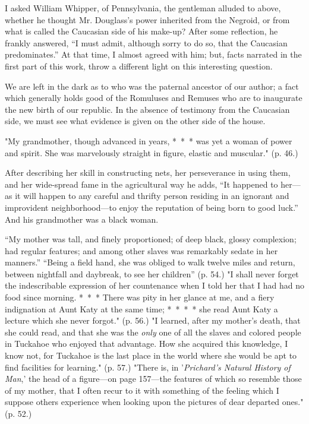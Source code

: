 I asked William Whipper, of Pennsylvania, the gentleman alluded to
above, whether he thought Mr. Douglass's power inherited from the
Negroid, or from what is called the Caucasian side of his make-up? After
some reflection, he frankly answered, ``I must admit, although sorry to
do so, that the Caucasian predominates.'' At that time, I almost agreed
with him; but, facts narrated in the first part of this work, throw a
different light on this interesting question.

We are left in the dark as to who was the paternal ancestor of our
author; a fact which generally holds good of the Romuluses and Remuses
who are to inaugurate the new birth of our republic. In the absence of
testimony from the Caucasian side, we must see what evidence is given on
the other side of the house.

"My grandmother, though advanced in years, {*~*~*} was yet a woman of
power and spirit. She was marvelously straight in figure, elastic and
muscular." (p. 46.)

After describing her skill in constructing nets, her perseverance in
using them, and her wide-spread fame in the agricultural way {}he adds,
``It happened to her---as it will happen to any careful and thrifty
person residing in an ignorant and improvident neighborhood---to enjoy
the reputation of being born to good luck.'' And his grandmother was a
black woman.

``My mother was tall, and finely proportioned; of deep black, glossy
complexion; had regular features; and among other slaves was remarkably
sedate in her manners.'' ``Being a field hand, she was obliged to walk
twelve miles and return, between nightfall and daybreak, to see her
children'' (p. 54.) "I shall never forget the indescribable expression
of her countenance when I told her that I had had no food since morning.
{*~*~*} There was pity in her glance at me, and a fiery indignation at
Aunt Katy at the same time; {*~*~*~*} she read Aunt Katy a lecture which
she never forgot." (p. 56.) "I learned, after my mother's death, that
she could read, and that she was the \emph{only} one of all the slaves
and colored people in Tuckahoe who enjoyed that advantage. How she
acquired this knowledge, I know not, for Tuckahoe is the last place in
the world where she would be apt to find facilities for learning." (p.
57.) "There is, in {'}\emph{Prichard's Natural History of Man},' the
head of a figure---on page 157---the features of which so resemble those
of my mother, that I often recur to it with something of the feeling
which I suppose others experience when looking upon the pictures of dear
departed ones." (p. 52.)

